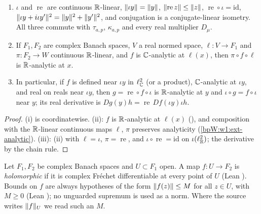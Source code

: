 \begin{lemma}\label{bpW:w1:complexification-lemma}
\begin{enumerate}[label=(\roman*)]
\item $\iota$ and $\operatorname{re}$ are continuous $\mathbb{R}$-linear, $\lVert \iota y\rVert=\lVert y\rVert$, $\lVert \operatorname{re}z\rVert\le\lVert z\rVert$,
  $\operatorname{re}\circ\iota=\mathrm{id}$, $\lVert \iota y+i\iota y'\rVert^2=\lVert y\rVert^2+\lVert y'\rVert^2$, and conjugation is a
  conjugate-linear isometry. All three commute with $\tau_{a,p}$, $\kappa_{a,p}$ and every real multiplier $D_\mu$.
\item If $F_1,F_2$ are complex Banach spaces, $V$ a real normed space, $\ell:V\to F_1$ and $\pi:F_2\to W$ continuous
  $\mathbb{R}$-linear, and $f$ is $\mathbb{C}$-analytic at $\ell(x)$, then $\pi\circ f\circ\ell$ is $\mathbb{R}$-analytic at $x$.
\item In particular, if $f$ is defined near $\iota y$ in $\ell^2_{\mathbb{C}}$ (or a product), $\mathbb{C}$-analytic at $\iota y$, and
  real on reals near $\iota y$, then $g=\operatorname{re}\circ f\circ\iota$ is $\mathbb{R}$-analytic at $y$ and $\iota\circ g=f\circ\iota$
  near $y$; its real derivative is $Dg(y)h=\operatorname{re}\,Df(\iota y)\iota h$.
\end{enumerate}
\end{lemma}

\begin{proof}
(i) is coordinatewise. (ii): $f$ is $\mathbb{R}$-analytic at $\ell(x)$ (), and composition
with the $\mathbb{R}$-linear continuous maps $\ell$, $\pi$ preserves analyticity (\ref{bpW:w1:ext-analytic}). (iii): (ii) with
$\ell=\iota$, $\pi=\operatorname{re}$, and $\iota\circ\operatorname{re}=\mathrm{id}$ on $\iota(\ell^2_{\mathbb{R}})$; the derivative by
the chain rule.
\end{proof}

\begin{definition}\label{bpW:w1:holomorphic}
Let $F_1,F_2$ be complex Banach spaces and $U\subset F_1$ open. A map $f:U\to F_2$ is \emph{holomorphic} if it is
complex Fr\'echet differentiable at every point of $U$ (Lean ). Bounds on $f$ are
always hypotheses of the form $\lVert f(z)\rVert\le M$ for all $z\in U$, with $M\ge0$ (Lean
); no unguarded supremum is used as a norm. Where the source writes $\lVert f\rVert_U$ we read
such an $M$.
\end{definition}

